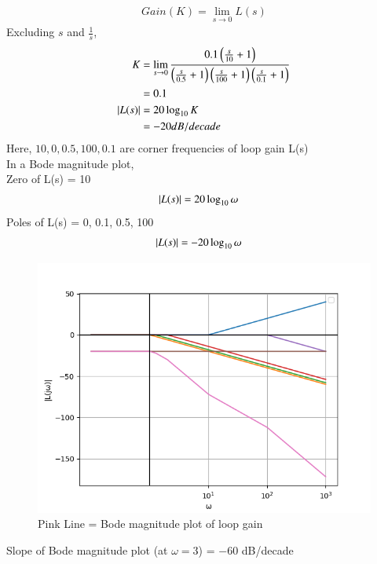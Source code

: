\documentclass[journal,12pt,twocolumn]{IEEEtran}
\theoremstyle{remark}
\begin{document}
\begin{align}
    Gain(K) = \lim_{s\rightarrow 0} L(s)
\end{align}
Excluding $s$ and $\frac{1}{s}$,
\begin{align}
    K &= \lim_{s\rightarrow 0} \frac{0.1\left(\frac{s}{10}+1\right)}{\left(\frac{s}{0.5}+1\right)\left(\frac{s}{100}+1\right)\left(\frac{s}{0.1}+1\right)}\\
    &= 0.1\\
    \left\vert L(s)\right\vert &= 20\log_{10} K\\
    &= -20 dB/decade
\end{align}
Here, $10,0,0.5,100,0.1$ are corner frequencies of loop gain L(s) \\
In a Bode magnitude plot,\\
Zero of L(s) = 10
\begin{align}
    \left\vert L(s)\right\vert &= 20\log_{10} \omega
\end{align}
Poles of L(s) = 0, 0.1, 0.5, 100
\begin{align}
    \left\vert L(s)\right\vert &= -20\log_{10} \omega
\end{align}
\begin{figure}[!h]
    \centering
    \includegraphics[width=\columnwidth]{figs/bode_mag_plot.png}
    \caption{Pink Line = Bode magnitude plot of loop gain}
\end{figure}
Slope of Bode magnitude plot (at $\omega=3$) = $-60$ dB/decade
\end{document}
